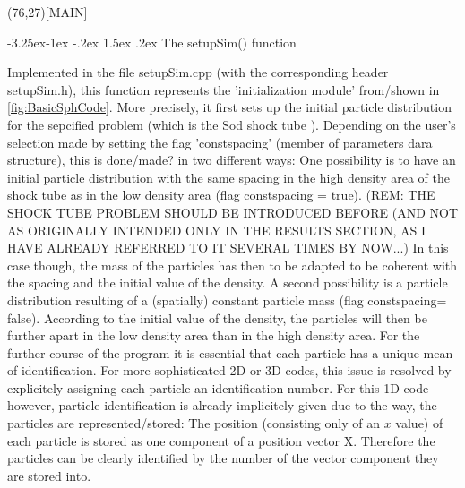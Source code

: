 \documentclass{report}
\makeatletter
\renewcommand\paragraph{\@startsection{paragraph}{4}{\z@}%
  {-3.25ex\@plus -1ex \@minus -.2ex}%
  {1.5ex \@plus .2ex}%
  {\normalfont\normalsize\bfseries}}
\makeatother
\begin{document}
\begin{center}
\sProofOn
\begin{struktogramm}(76,27)[MAIN]
\end{struktogramm}
\sProofOff
\end{center}

\paragraph{The setupSim() function}

Implemented in the file setupSim.cpp (with the corresponding header setupSim.h), this function represents the 'initialization module' from/shown in \ref{fig:BasicSphCode}. More precisely, it first sets up the initial particle distribution for the sepcified problem (which is the Sod shock tube \cite{Sod1978}). Depending on the user's selection made by setting the flag 'constspacing' (member of parameters dara structure), this is done/made? in two different ways:
One possibility is to have an initial particle distribution with the same spacing in the high density area of the shock tube as in the low density area (flag constspacing = true). (REM: THE SHOCK TUBE PROBLEM SHOULD BE INTRODUCED BEFORE (AND NOT AS ORIGINALLY INTENDED ONLY IN THE RESULTS SECTION, AS I HAVE ALREADY REFERRED TO IT SEVERAL TIMES BY NOW...) In this case though, the mass of the particles has then to be adapted to be coherent with the spacing and the initial value of the density.
A second possibility is a particle distribution resulting of a (spatially) constant particle mass (flag constspacing= false). According to the initial value of the density, the particles will then be further apart in the low density area than in the high density area.
For the further course of the program it is essential that each particle has a unique mean of identification. For more sophisticated 2D or 3D codes, this issue is resolved by explicitely assigning each particle an identification number. For this 1D code however, particle identification is already implicitely given due to the way, the particles are represented/stored: The position (consisting only of an $x$ value) of each particle is stored as one component of a position vector X. Therefore the particles can be clearly identified by the number of the vector component they are stored into.
\end{document}
